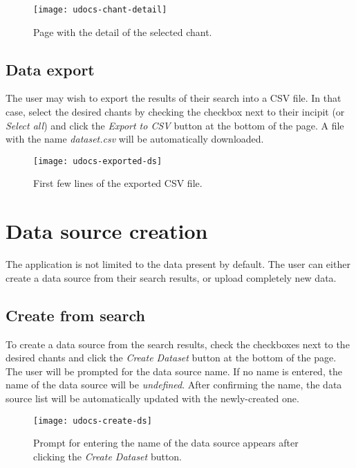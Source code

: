 \begin{figure}[!h]
\centering
\texttt{[image: udocs-chant-detail]}
\caption{Page with the detail of the selected chant.}
\label{fig:chant-detail}
\end{figure}

\subsection{Data export}

The user may wish to export the results of their search into a CSV file. In that case, select the desired chants by checking the checkbox next to
their incipit (or \emph{Select all}) and click the \emph{Export to CSV} button at the bottom of the page. A file with the name \emph{dataset.csv}
will be automatically downloaded.

\begin{figure}[!h]
\centering
\texttt{[image: udocs-exported-ds]}
\caption{First few lines of the exported CSV file.}
\label{fig:export-ex}
\end{figure}

\section{Data source creation}

The application is not limited to the data present by default. The user can either create a data source from their search results, or upload
completely new data.

\subsection{Create from search}

To create a data source from the search results, check the checkboxes next to the desired chants and click the \emph{Create Dataset} button at the bottom
of the page. The user will be prompted for the data source name. If no name is entered, the name of the data source will be \emph{undefined}. After confirming
the name, the data source list will be automatically updated with the newly-created one.

\begin{figure}[!h]
\centering
\texttt{[image: udocs-create-ds]}
\caption{Prompt for entering the name of the data source appears after clicking the \emph{Create Dataset} button.}
\label{fig:create-ds}
\end{figure}

